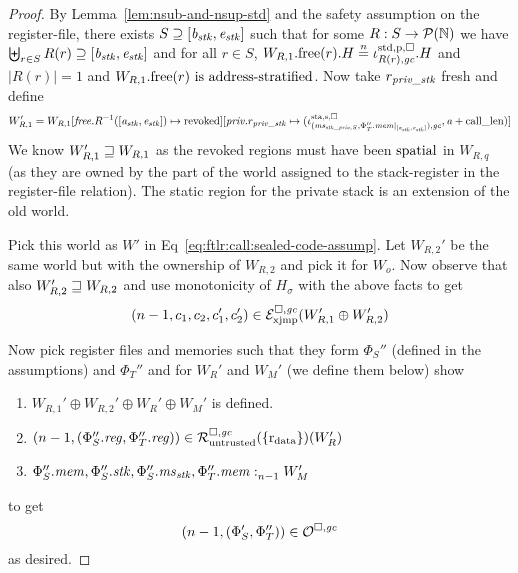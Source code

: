 \begin{proof}
  By Lemma~\ref{lem:nsub-and-nsup-std} and the safety assumption on the register-file, there exists $S \supseteq [\baddr_\stk, \eaddr_\stk]$ such that for some $R : S \fun \powerset{\nats}$ we have $\biguplus_{r \in S} R(r) \supseteq [\baddr_\stk,\eaddr_\stk]$ and for all $r \in S$, $\pwfree[W_{R,1}](r).H \nequal \stdreg{R(r),\gc}{\pur}.H$ and $|R(r)| = 1$ and $\pwfree[W_{R,1}](r) \text{ is address-stratified}$.
  Now take $r_\var{priv\_stk}$ fresh and define
  \[
    W_{R,1}' = W_{R,1}[\free.R^{-1}([\aaddr_\stk,\eaddr_\stk]) \mapsto \revoked][\priv.r_\var{priv\_stk} \mapsto (\stareg[(\ms_{\stk\_\priv,S},\Phi_T''.\mem|_{[\aaddr_\stk,\eaddr_\stk]}),\gc]{\spa,\square},\aaddr+\calllen)]
  \]
  We know $W_{R,1}' \future W_{R,1}$ as the revoked regions must have been $\spatial$ in $W_{R,q}$ (as they are owned by the part of the world assigned to the stack-register in the register-file relation).
  The static region for the private stack is an extension of the old world.

  Pick this world as $W'$ in Eq~\ref{eq:ftlr:call:sealed-code-assump}.
  Let $W_{R,2}'$ be the same world but with the ownership of $W_{R,2}$ and pick it for $W_o$.
  Now observe that also $W_{R,2}' \future W_{R,2}$ and use monotonicity of $H_\sigma$ with the above facts to get
  \[
    \npair[n-1]{c_1,c_2,c_1',c_2'} \in \lrexj(W_{R,1}'\oplus W_{R,2}')
  \]

  Now pick register files and memories such that they form $\Phi_S''$ (defined in
  the assumptions) and $\Phi_T''$ and for $W_R'$ and $W_M'$ (we define them below) show
  \begin{enumerate}[label=\roman*.]
  \item \label{case:ftlr:scall:world} $W_{R,1}'\oplus W_{R,2}' \oplus W_R' \oplus W_M'$ is defined.
  \item \label{case:ftlr:scall:reg} $\npair[n-1]{(\Phi_S''.\reg,\Phi_T''.\reg)} \in \lrr(\{\rdata\})(W_R')$
  \item \label{case:ftlr:scall:mem} $\memSat[n-1]{\Phi_S''.\mem,\Phi_S''.\stk,\Phi_S''.\ms_\stk,\Phi_T''.\mem}{W_M'}$
  \end{enumerate}
  to get
  \[
    \npair[n-1]{(\Phi_S',\Phi_T'')} \in \lro
  \]
  as desired.


\end{proof}
